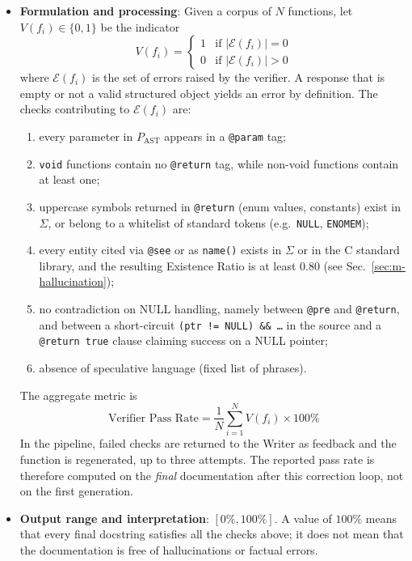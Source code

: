 \begin{itemize}[leftmargin=*, label=\textbullet]
	\item \textbf{Formulation and processing}: Given a corpus of $N$ functions, let
	$V(f_i)\in\{0,1\}$ be the indicator
	\begin{equation}
		V(f_i) =
		\begin{cases}
			1 & \text{if } |\mathcal{E}(f_i)| = 0 \\
			0 & \text{if } |\mathcal{E}(f_i)| > 0
		\end{cases}
		\label{eq:verifier_bool}
	\end{equation}
	where $\mathcal{E}(f_i)$ is the set of errors raised by the verifier. A response that is empty or
	not a valid structured object yields an error by definition. The checks contributing to
	$\mathcal{E}(f_i)$ are:
	\begin{enumerate}[label=(\alph*)]
		\item every parameter in $P_{\mathrm{AST}}$ appears in a \texttt{@param} tag;
		\item \texttt{void} functions contain no \texttt{@return} tag, while non-void functions
		contain at least one;
		\item uppercase symbols returned in \texttt{@return} (enum values, constants) exist in
		$\Sigma$, or belong to a whitelist of standard tokens (e.g.\ \texttt{NULL},
		\texttt{ENOMEM});
		\item every entity cited via \texttt{@see} or as \texttt{name()} exists in $\Sigma$ or in the
		C standard library, and the resulting Existence Ratio is at least $0.80$
		(see Sec.~\ref{sec:m-hallucination});
		\item no contradiction on NULL handling, namely between \texttt{@pre} and \texttt{@return},
		and between a short-circuit \texttt{(ptr != NULL) \&\& \ldots} in the source and a
		\texttt{@return true} clause claiming success on a NULL pointer;
		\item absence of speculative language (fixed list of phrases).
	\end{enumerate}
	The aggregate metric is
	\begin{equation}
		\text{Verifier Pass Rate} = \frac{1}{N}\sum_{i=1}^{N} V(f_i)\times 100\%
		\label{eq:verifier_pass_rate}
	\end{equation}
	In the pipeline, failed checks are returned to the Writer as feedback and the function is
	regenerated, up to three attempts. The reported pass rate is therefore computed on the
	\emph{final} documentation after this correction loop, not on the first generation.
	
	\item \textbf{Output range and interpretation}: $[0\%, 100\%]$. A value of $100\%$ means that
	every final docstring satisfies all the checks above; it does not mean that the documentation is
	free of hallucinations or factual errors.
	

\end{itemize}
